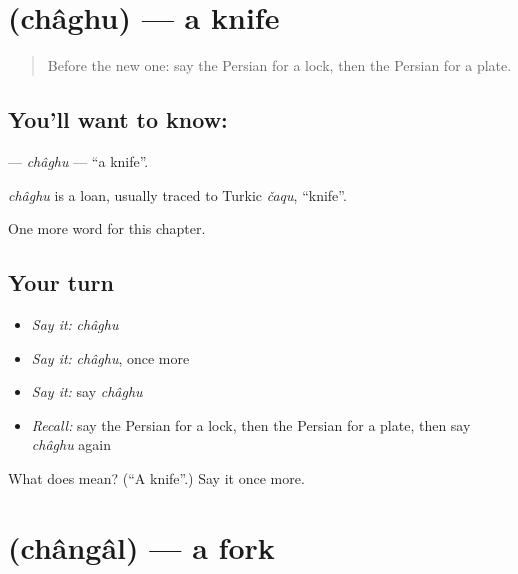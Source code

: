 \section[\texorpdfstring{\fa{چاقو} (châghu)}{چاقو (châghu)}]{ (châghu) — a knife}

\label{lesson:FA-C47-chaghu}



\begin{quote}
Before the new one: say the Persian for a lock, then the Persian for a plate.
\end{quote}

\subsection*{You'll want to know: }
\textbf{} — \emph{châghu} — \textquotedblleft{}a knife\textquotedblright{}.

\begin{cousinweb}
\emph{châghu} is a loan, usually traced to Turkic \emph{čaqu}, \textquotedblleft{}knife\textquotedblright{}.
\end{cousinweb}

\begin{grammarlens}[title={What you've built}]
One more word for this chapter.
\end{grammarlens}

\subsection*{Your turn}
\begin{itemize}
\raggedright
  \item \emph{Say it:} \emph{châghu}
  \item \emph{Say it:} \emph{châghu}, once more
  \item \emph{Say it:} say \emph{châghu}
  \item \emph{Recall:} say the Persian for a lock, then the Persian for a plate, then say \emph{châghu} again
\end{itemize}

\begin{tcolorbox}[breakable,colback=teal!4,colframe=teal!35!black,title={Before you move on}]
What does  mean? (\textquotedblleft{}A knife\textquotedblright{}.) Say it once more.
\end{tcolorbox}
\section[\texorpdfstring{\fa{چنگال} (chângâl)}{چنگال (chângâl)}]{ (chângâl) — a fork}

